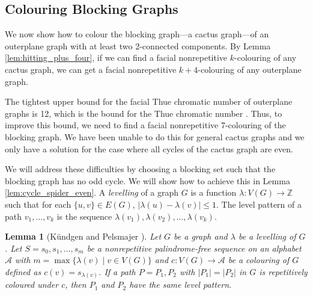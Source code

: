 \documentclass{patmorin}
\newcommand{\integers}{\mathbb{Z}}
\newtheorem{lemma}[theorem]{Lemma}
\begin{document}

\subsection{Colouring Blocking Graphs}

We now show how to colour the blocking graph---a cactus graph---of an outerplane graph with at least two 2-connected components.
By Lemma \ref{lem:hitting_plus_four}, if we can find a facial nonrepetitive $k$-colouring of any cactus graph, we can get a facial nonrepetitive $k+4$-colouring of any outerplane graph. 

The tightest upper bound for the facial Thue chromatic number of outerplane graphs is 12, which is the bound for the Thue chromatic number \cite{barat2007square, kundgen2008nonrepetitive}. Thus, to improve this bound, we need to find a facial nonrepetitive 7-colouring of the blocking graph.  We have been unable to do this for general cactus graphs and we only have a solution for the case where all cycles of the cactus graph are even. 

We will address these difficulties by choosing a blocking set such that the blocking graph has no odd cycle. We will show how to achieve this in Lemma \ref{lem:cycle_spider_even}. 
A \emph{levelling} of a graph $G$ is a function $\lambda : V(G) \rightarrow \integers$ such that for each $\{u,v\}\in E(G)$, $|\lambda(u)-\lambda(v)|\leq 1$. The level pattern of a path $v_1,\ldots,v_k$ is the sequence $\lambda(v_1),\lambda(v_2),\ldots,\lambda(v_k)$.

\begin{lemma}[K{\"u}ndgen and Pelsmajer \cite{kundgen2008nonrepetitive}]
 Let $G$ be a graph and $\lambda$ be a levelling of $G$. Let $S=s_0,s_1,\ldots,s_m$ be a nonrepetitive palindrome-free sequence on an alphabet $\mathcal{A}$ with $m=\max\{\lambda(v) \;|\; v \in V(G)\}$ and $c : V(G) \rightarrow \mathcal{A}$ be a colouring of $G$ defined as $c(v)=s_{\lambda(v)}$. %
 If a path $P=P_1, P_2$ with $|P_1|=|P_2|$ in $G$ is repetitively coloured under $c$, then $P_1$ and $P_2$ have the same level pattern.
 \label{lem:level_pattern_palindrome_free}
\end{lemma}
\end{document}
